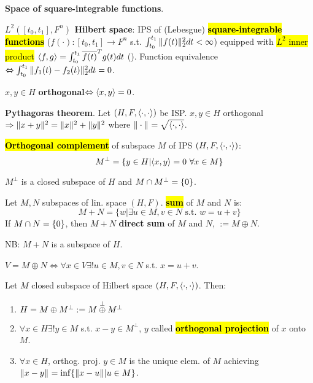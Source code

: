 \textbf{Space of square-integrable functions}.
\begin{Definition}
\textbf{$L^2([t_0,t_1],F^n)$ Hilbert space}: IPS of (Lebesgue) \textbf{\hl{square-integrable functions}} ($f(\cdot):[t_0,t_1]\to F^n$ s.t. $\int_{t_0}^{t_1}\|f(t)\|_{2}^2 dt<\infty$) equipped with \hl{$L^2$ inner product} $\langle f,g\rangle=\int_{t_0}^{t_1}\overline{f(t)}^Tg(t)dt$ (). Function equivalence $\Leftrightarrow\int_{t_0}^{t_1}\|f_1(t)-f_2(t)\|_{2}^2dt=0$.
\end{Definition}
\begin{Definition}
$x,y\in H$ \textbf{orthogonal}$\Leftrightarrow\langle x,y\rangle=0$.
\end{Definition}
\begin{Theorem}
\textbf{Pythagoras theorem}. Let $(H,F,\langle\cdot,\cdot\rangle)$ be ISP. $x,y\in H$ orthogonal$\Rightarrow\|x+y\|_{}^2=\|x\|_{}^2+\|y\|_{}^2$ where $\|\cdot\|_{}=\sqrt{\langle\cdot,\cdot\rangle}$.
\end{Theorem}
\begin{Definition}
\textbf{\hl{Orthogonal complement}} of subspace $M$ of IPS $(H,F,\langle\cdot,\cdot\rangle)$:
\begin{equation*}
M^\perp=\{y\in H|\langle x,y\rangle=0\,\,\forall x\in M\}
\end{equation*}
\end{Definition}
\begin{Fact}
$M^\perp$ is a closed subspace of $H$ and $M\cap M^\perp=\{0\}$.
\end{Fact}
\begin{Definition}
Let $M,N$ subspaces of lin. space $(H,F)$. \textbf{\hl{sum}} of $M$ and $N$ is:
\begin{equation*}
M+N=\{w|\exists u\in M, v\in N\text{ s.t. }w=u+v\}
\end{equation*}
If $M\cap N=\{0\}$, then $M+N$ \textbf{direct sum} of $M$ and $N$, $:=M\oplus N$.
\end{Definition}
NB: $M+N$ is a subspace of $H$.
\begin{Fact}
$V=M\oplus N\Leftrightarrow\forall x\in V\exists! u\in M,v\in N$ s.t. $x=u+v$.
\end{Fact}
\begin{Theorem}
\hypertarget{min_theorem7_3}{\textbf{}} Let $M$ closed subspace of Hilbert space $(H,F,\langle\cdot,\cdot\rangle)$. Then:
\begin{enumerate}
  \item $H=M\oplus M^\perp:=M\overset{\perp}{\oplus} M^\perp$
  \item $\forall x\in H\exists!y\in M$ s.t. $x-y\in M^\perp$, $y$ called \textbf{\hl{orthogonal projection}} of $x$ onto $M$.
  \item $\forall x\in H$, orthog. proj. $y\in M$ is the unique elem. of $M$ achieving $\|x-y\|_{}=\inf\{\|x-u\|_{}|u\in M\}$.
\end{enumerate}
\end{Theorem}
